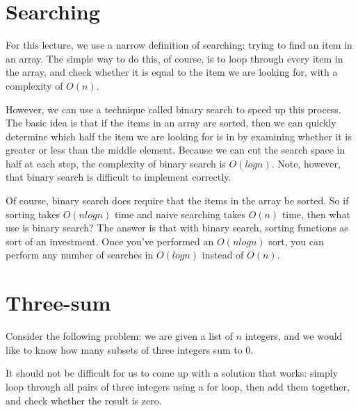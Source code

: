 \documentclass{article}
\begin{document}
\section{Searching}

For this lecture, we use a narrow definition of searching: trying to find an item in an array. The simple way to do this, of course, is to loop through every item in the array, and check whether it is equal to the item we are looking for, with a complexity of $O(n)$.

However, we can use a technique called binary search to speed up this process. The basic idea is that if the items in an array are sorted, then we can quickly determine which half the item we are looking for is in by examining whether it is greater or less than the middle element. Because we can cut the search space in half at each step, the complexity of binary search is $O(log n)$. Note, however, that binary search is difficult to implement correctly.

Of course, binary search does require that the items in the array be sorted. So if sorting takes $O(n log n)$ time and naive searching takes $O(n)$ time, then what use is binary search? The answer is that with binary search, sorting functions as sort of an investment. Once you've performed an $O(n log n)$ sort, you can perform any number of searches in $O(log n)$ instead of $O(n)$.



\section{Three-sum}

Consider the following problem: we are given a list of $n$ integers, and we would like to know how many subsets of three integers sum to 0.

It should not be difficult for us to come up with a solution that works: simply loop through all pairs of three integers using a for loop, then add them together, and check whether the result is zero.

\end{document}
